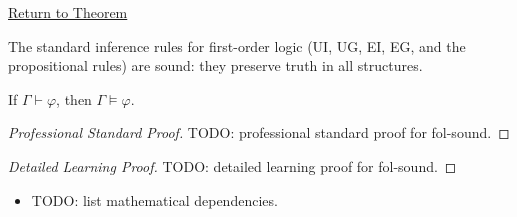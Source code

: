 \newpage
{}
\label{prf:fol-sound}

\begin{remark*}[Return]
\hyperref[thm:fol-sound]{Return to Theorem}
\end{remark*}

\begin{theorem*}
The standard inference rules for first-order logic (UI, UG, EI, EG, and the
propositional rules) are sound: they preserve truth in all structures.

If $\Gamma \vdash \varphi$, then $\Gamma \models \varphi$.
\end{theorem*}

\begin{proof}[Professional Standard Proof]
\LRAProofBodyStart
TODO: professional standard proof for fol-sound.
\end{proof}

\begin{proof}[Detailed Learning Proof]
\LRAProofBodyStart
TODO: detailed learning proof for fol-sound.
\end{proof}

\begin{remark*}
\end{remark*}

\begin{dependencies}
\begin{itemize}
  \item TODO: list mathematical dependencies.
\end{itemize}
\end{dependencies}

\clearpage
